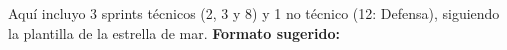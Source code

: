 \documentclass[
11pt, %
]{charter}
\begin{document}






Aquí incluyo 3 sprints técnicos (2, 3 y 8) y 1 no técnico (12: Defensa), siguiendo la plantilla de la estrella de mar.
\textbf{Formato sugerido:}
\end{document}
